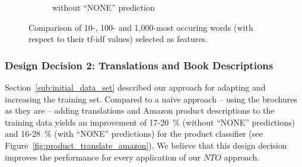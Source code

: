 \begin{figure}[h!]
\begin{subfigure}[t]{0.5\textwidth}
		\caption{without ``NONE'' prediction}
	\end{subfigure}
	\caption{Comparison of 10-, 100- and 1,000-most occuring words (with respect to their tf-idf values) selected as features.}
	\label{fig:product_feature_selection}
\end{figure}

\subsubsection{Design Decision 2: Translations and Book Descriptions}
Section~\ref{sub:initial_data_set} described our approach for adapting and increasing the training set.
Compared to a na\"ive approach -- using the brochures as they are -- adding translations and Amazon product descriptions to the training data yields an improvement of 17-20~\% (without ``NONE'' predictions) and 16-28~\% (with ``NONE'' predictions) for the product classifier (see Figure~\ref{fig:product_translate_amazon}).
We believe that this design decision improves the performance for every application of our $NTO$ approach.

